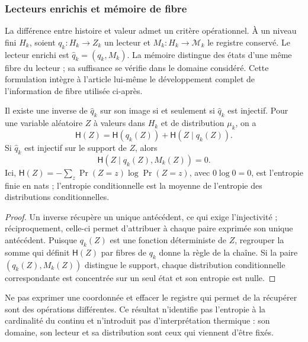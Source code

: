 \subsubsection{Lecteurs enrichis et mémoire de fibre}
\label{act21:sec:ch-memoria-fibra}

La différence entre histoire et valeur admet un critère opérationnel. À un
niveau fini \(H_k\), soient \(q_k:H_k\to Z_k\) un lecteur et
\(M_k:H_k\to\mathcal M_k\) le registre conservé. Le lecteur enrichi
est \(\widehat q_k=(q_k,M_k)\). La mémoire distingue des états d'une même
fibre du lecteur ; sa suffisance se vérifie dans le domaine considéré.
Cette formulation intègre à l'article lui-même le développement complet de
l'information de fibre utilisée ci-après.

\begin{proposition}
\label{act21:prop:ch-recuperabilidad-fibra}
Il existe une inverse de \(\widehat q_k\) sur son image si et seulement si \(\widehat q_k\) est injectif. Pour une variable aléatoire \(Z\) à valeurs dans \(H_k\) et de distribution \(\mu_k\), on a
\[
 \mathsf H(Z)=\mathsf H(q_k(Z))+\mathsf H(Z\mid q_k(Z)).
\]
Si \(\widehat q_k\) est injectif sur le support de \(Z\), alors
\[
 \mathsf H(Z\mid q_k(Z),M_k(Z))=0.
\]
Ici, \(\mathsf H(Z)=-\sum_z\Pr(Z=z)\log\Pr(Z=z)\), avec
\(0\log0=0\), est l'entropie finie en nats ; l'entropie conditionnelle est
la moyenne de l'entropie des distributions conditionnelles.
\end{proposition}

\begin{proof}
Un inverse récupère un unique antécédent, ce qui exige l’injectivité ;
réciproquement, celle-ci permet d’attribuer à chaque paire exprimée son unique
antécédent. Puisque \(q_k(Z)\) est une fonction déterministe de \(Z\),
regrouper la somme qui définit \(\mathsf H(Z)\) par fibres de \(q_k\) donne la
règle de la chaîne. Si la paire \((q_k(Z),M_k(Z))\) distingue le support,
chaque distribution conditionnelle correspondante est concentrée sur un seul
état et son entropie est nulle.

\end{proof}

Ne pas exprimer une coordonnée et effacer le registre qui permet de la récupérer sont
des opérations différentes. Ce résultat n’identifie pas l’entropie à la cardinalité
du continu et n’introduit pas d’interprétation thermique : son domaine, son lecteur et sa
distribution sont ceux qui viennent d’être fixés.


